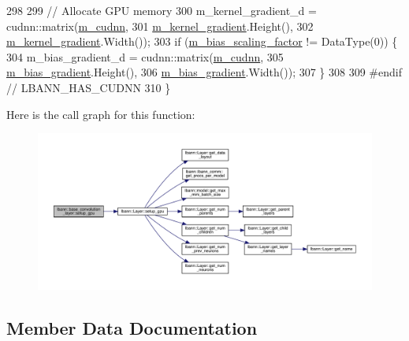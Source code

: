 \begin{DoxyCode}
298 
299     \textcolor{comment}{// Allocate GPU memory}
300     m\_kernel\_gradient\_d = cudnn::matrix(\hyperlink{classlbann_1_1Layer_a08dbb94239e3b8c96329786c57c72e21}{m\_cudnn},
301                                         \hyperlink{classlbann_1_1base__convolution__layer_a4129f11df61ed92bcad24ae855d7bd11}{m\_kernel\_gradient}.Height(),
302                                         \hyperlink{classlbann_1_1base__convolution__layer_a4129f11df61ed92bcad24ae855d7bd11}{m\_kernel\_gradient}.Width());
303     \textcolor{keywordflow}{if} (\hyperlink{classlbann_1_1base__convolution__layer_a5abe0bcd128b66a41fa481b28a9c2104}{m\_bias\_scaling\_factor} != DataType(0)) \{
304       m\_bias\_gradient\_d = cudnn::matrix(\hyperlink{classlbann_1_1Layer_a08dbb94239e3b8c96329786c57c72e21}{m\_cudnn},
305                                         \hyperlink{classlbann_1_1base__convolution__layer_a2ee1db4a1a74f167e3472d5ed7075179}{m\_bias\_gradient}.Height(),
306                                         \hyperlink{classlbann_1_1base__convolution__layer_a2ee1db4a1a74f167e3472d5ed7075179}{m\_bias\_gradient}.Width());
307     \}
308 
309 \textcolor{preprocessor}{  #endif // LBANN\_HAS\_CUDNN}
310   \}
\end{DoxyCode}
Here is the call graph for this function\+:\nopagebreak
\begin{figure}[H]
\begin{center}
\leavevmode
\includegraphics[width=350pt]{classlbann_1_1base__convolution__layer_a4fb0ec8793656a7c32ff37c266b29a68_cgraph}
\end{center}
\end{figure}


\subsection{Member Data Documentation}
\mbox{\label{classlbann_1_1base__convolution__layer_a2ee1db4a1a74f167e3472d5ed7075179}} 
